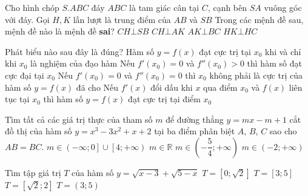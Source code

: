 \begin{ex}%
	Cho hình chóp $S. ABC$ đáy $ABC$ là tam giác cân tại $C$, cạnh bên $SA$ vuông góc với đáy. Gọi $H, K$ lần lượt là trung điểm của $AB$ và $SB$
	Trong các mệnh đề sau, mệnh đề nào là mệnh đề \textbf{sai}?
		\choice
		{$CH\bot SB$}
		{$CH\bot AK$}
		{\True $AK\bot BC$}
		{$HK\bot HC$}
	\end{ex}
\begin{ex}%
		Phát biểu nào sau đây là đúng?
		\choice
		{Hàm số $y=f(x)$ đạt cực trị tại $x_0$ khi và chỉ khi $x_0$ là nghiệm của đạo hàm}
		{Nếu $f'\left(x_0\right)=0$ và $f''\left(x_0\right)>0$ thì hàm số đạt cực đại tại $x_0$}
		{Nếu $f'\left(x_0\right)=0$ và $f''\left(x_0\right)=0$ thì $x_0$ không phải là cực trị của hàm số $y=f(x)$ đã cho}
		{\True Nếu $f'(x)$ đổi dấu khi $x$ qua điểm $x_0$ và $f(x)$ liên tục tại $x_0$ thì hàm số $y=f(x)$ đạt cực trị tại điểm $x_0$
		}
\end{ex}
\begin{ex}%
	Tìm tất cả các giá trị thực của tham số $m$ để đường thẳng $y=mx-m+1$ cắt đồ thị của hàm số $y=x^3-3x^2+x+2$ tại ba điểm phân biệt $A$, $B$, $C$ sao cho $AB=BC$.
	\haicot
	{$m\in \left(-\infty; 0\right]\cup \left[4; + \infty\right)$}
	{$m\in \mathbb{R}$}
	{$m\in \left(-\dfrac{5}{4};+\infty\right)$}
	{\True $m\in \left(-2; +\infty\right)$}
\end{ex}

\begin{ex}%
	Tìm tập giá trị $T$ của hàm số $y=\sqrt{x-3}+ \sqrt{5-x}$
	\choice
	{$T= \left[0; \sqrt{2}\right]$}
	{$T=\left[3; 5\right]$}
	{\True $T= \left[\sqrt{2}; 2\right]$}
	{$T= \left(3; 5\right)$}
\end{ex}

